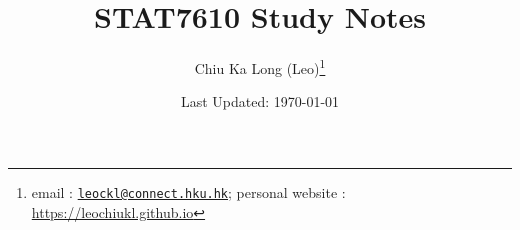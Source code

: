 \documentclass{article}
\begin{document}
\title{STAT7610 Study Notes}
\author{Chiu Ka Long (Leo)\thanks{
email :
\href{mailto:leockl@connect.hku.hk}{\texttt{leockl@connect.hku.hk}};
personal website :
\url{https://leochiukl.github.io}
}}
\date{Last Updated: \today}
\maketitle
\doclicenseThis
\tableofcontents
\nocite{*}

\printbibliography

\end{document}
